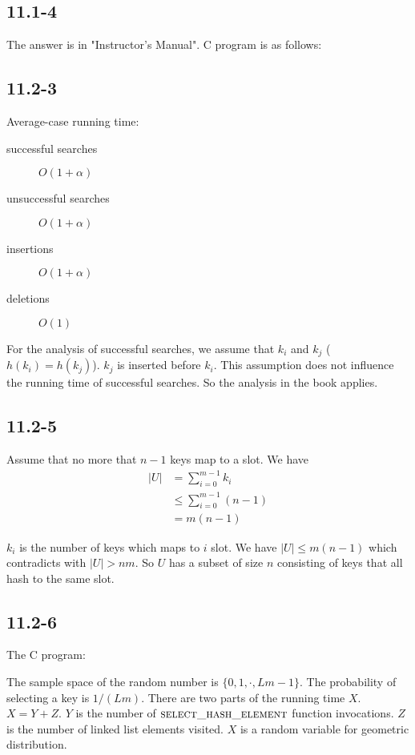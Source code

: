 \documentclass{book}
\begin{document}
\begin{CJK}{UTF8}{gkai}
\subsection*{11.1-4}
The answer is in "Instructor's Manual".
C program is as follows:
%

\subsection*{11.2-3}
Average-case running time:
\begin{description}
\item[successful searches] $O(1+\alpha)$
\item[unsuccessful searches] $O(1+\alpha)$
\item[insertions] $O(1+\alpha)$
\item[deletions] $O(1)$
\end{description}
For the analysis of successful searches, we assume that $k_i$ and $k_j$ ($h(k_i) 
= h(k_j)$). $k_j$ is inserted before $k_i$. This assumption does not influence 
the running time of successful searches. So the analysis in the book applies.

\subsection*{11.2-5}
Assume that no more that $n-1$ keys map to a slot. We have
\begin{align*}
|U| &= \sum_{i=0}^{m-1}k_i \\
&\le \sum_{i=0}^{m-1} (n-1) \\
& = m(n-1)
\end{align*}

$k_i$ is the number of keys which maps to $i$ slot. We have $|U|\le m(n-1)$ 
which contradicts with $|U|>nm$. So $U$ has a subset of size $n$ consisting of 
keys that all hash to the same slot.

\subsection*{11.2-6}
The C program:

%

The sample space of the random number is $\{0,1, \cdot, Lm-1\}$. The probability 
of selecting a key is $1/(Lm)$. There are two parts of the running time $X$.  
$X=Y+Z$.  $Y$ is the number of $\textnormal{\scshape select\_hash\_element}$ function 
invocations. $Z$ is the number of linked list elements visited. $X$ is a random 
variable for geometric distribution. 


\end{CJK}
\end{document}
